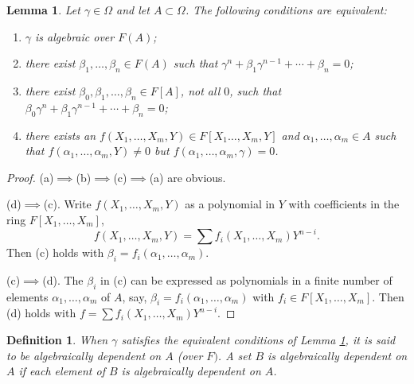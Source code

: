 \documentclass[a4paper,11pt,final,openany]{memoir}
\newtheorem{lemma}[X]{Lemma}
\newtheorem{definition}[X]{Definition}
\theoremstyle{nonumberplain}
\newtheorem{proof}{Proof.}
\begin{document}
\begin{lemma}
\label{te2m}Let $\gamma\in\Omega$ and let $A\subset\Omega$. The following
conditions are equivalent:

\begin{enumerate}
\item $\gamma$ is algebraic over $F(A)$;

\item there exist $\beta_{1},\ldots,\beta_{n}\in F(A)$ such that $\gamma
^{n}+\beta_{1}\gamma^{n-1}+\cdots+\beta_{n}=0$;

\item there exist $\beta_{0},\beta_{1},\ldots,\beta_{n}\in F[A]$, not all $0$,
such that $\beta_{0}\gamma^{n}+\beta_{1}\gamma^{n-1}+\cdots+\beta_{n}=0$;

\item there exists an $f(X_{1},\ldots,X_{m},Y)\in F[X_{1}\ldots,X_{m},Y]$ and
$\alpha_{1},\ldots,\alpha_{m}\in A$ such that $f(\alpha_{1},\ldots,\alpha
_{m},Y)\neq0$ but $f(\alpha_{1},\ldots,\alpha_{m},\gamma)=0$.
\end{enumerate}
\end{lemma}

\begin{proof}
(a)$\implies$(b)$\implies$(c)$\implies$(a) are obvious.

(d)$\implies$(c). Write $f(X_{1},\ldots,X_{m},Y)$ as a polynomial in $Y$ with
coefficients in the ring $F[X_{1},\ldots,X_{m}]$,%
\[
f(X_{1},\ldots,X_{m},Y)=%
{\textstyle\sum}
f_{i}(X_{1},\ldots,X_{m})Y^{n-i}\text{.}%
\]
Then (c) holds with $\beta_{i}=f_{i}(\alpha_{1},\ldots,\alpha_{m})$.

(c)$\implies$(d). The $\beta_{i}$ in (c) can be expressed as polynomials in a
finite number of elements $\alpha_{1},\ldots,\alpha_{m}$ of $A$, say,
$\beta_{i}=f_{i}(\alpha_{1},\ldots,\alpha_{m})$ with $f_{i}\in F[X_{1}%
,\ldots,X_{m}]$. Then (d) holds with $f=%
{\textstyle\sum}
f_{i}(X_{1},\ldots,X_{m})Y^{n-i}$.
\end{proof}

\begin{definition}
When $\gamma$ satisfies the equivalent conditions of Lemma \ref{te2m}, it is
said to be \emph{algebraically dependent\/} on $A$ (over $F)$. A set $B$ is
\emph{algebraically dependent\/} on $A$ if each element of $B$ is
algebraically dependent on $A$.
\end{definition}
\end{document}
